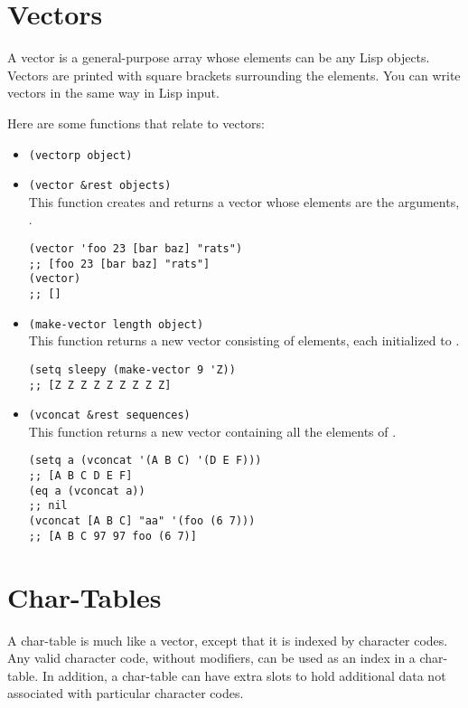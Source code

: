 \section{Vectors}
\label{sec:vectors}

A vector is a general-purpose array whose elements can be any Lisp objects.
Vectors are printed with square brackets surrounding the elements.
You can write vectors in the same way in Lisp input.

Here are some functions that relate to vectors:
\begin{itemize}
\item \lstinline|(vectorp object)|
\item \lstinline|(vector &rest objects)|\\
  This function creates and returns a vector whose elements are the arguments, .
\begin{lstlisting}
(vector 'foo 23 [bar baz] "rats")
;; [foo 23 [bar baz] "rats"]
(vector)
;; []
\end{lstlisting}
\item \lstinline|(make-vector length object)|\\
  This function returns a new vector consisting of  elements, each initialized to .
\begin{lstlisting}
(setq sleepy (make-vector 9 'Z))
;; [Z Z Z Z Z Z Z Z Z]
\end{lstlisting}
\item \lstinline|(vconcat &rest sequences)|\\
  This function returns a new vector containing all the elements of .
\begin{lstlisting}
(setq a (vconcat '(A B C) '(D E F)))
;; [A B C D E F]
(eq a (vconcat a))
;; nil
(vconcat [A B C] "aa" '(foo (6 7)))
;; [A B C 97 97 foo (6 7)]
\end{lstlisting}
\end{itemize}


\section{Char-Tables}
\label{sec:char-tables}

A char-table is much like a vector, except that it is indexed by character codes.
Any valid character code, without modifiers, can be used as an index in a char-table.
In addition, a char-table can have extra slots to hold additional data not associated with particular character codes.


